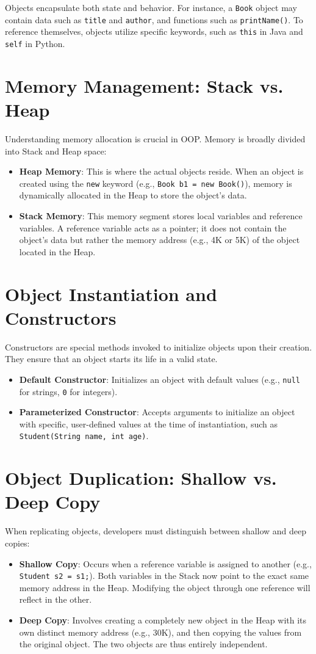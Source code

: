 \documentclass[10pt,journal,compsoc]{IEEEtran}
\begin{document}
Objects encapsulate both state and behavior. For instance, a \texttt{Book} object may contain data such as \texttt{title} and \texttt{author}, and functions such as \texttt{printName()}. To reference themselves, objects utilize specific keywords, such as \texttt{this} in Java and \texttt{self} in Python.

\section{Memory Management: Stack vs. Heap}
Understanding memory allocation is crucial in OOP. Memory is broadly divided into Stack and Heap space:
\begin{itemize}
\item \textbf{Heap Memory}: This is where the actual objects reside. When an object is created using the \texttt{new} keyword (e.g., \texttt{Book b1 = new Book()}), memory is dynamically allocated in the Heap to store the object's data.
\item \textbf{Stack Memory}: This memory segment stores local variables and reference variables. A reference variable acts as a pointer; it does not contain the object's data but rather the memory address (e.g., 4K or 5K) of the object located in the Heap.
\end{itemize}

\section{Object Instantiation and Constructors}
Constructors are special methods invoked to initialize objects upon their creation. They ensure that an object starts its life in a valid state.
\begin{itemize}
\item \textbf{Default Constructor}: Initializes an object with default values (e.g., \texttt{null} for strings, \texttt{0} for integers).
\item \textbf{Parameterized Constructor}: Accepts arguments to initialize an object with specific, user-defined values at the time of instantiation, such as \texttt{Student(String name, int age)}.
\end{itemize}

\section{Object Duplication: Shallow vs. Deep Copy}
When replicating objects, developers must distinguish between shallow and deep copies:
\begin{itemize}
\item \textbf{Shallow Copy}: Occurs when a reference variable is assigned to another (e.g., \texttt{Student s2 = s1;}). Both variables in the Stack now point to the exact same memory address in the Heap. Modifying the object through one reference will reflect in the other.
\item \textbf{Deep Copy}: Involves creating a completely new object in the Heap with its own distinct memory address (e.g., 30K), and then copying the values from the original object. The two objects are thus entirely independent.
\end{itemize}
\end{document}
